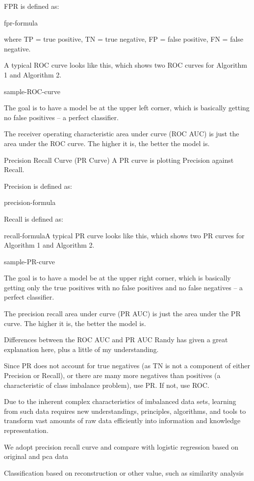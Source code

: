 FPR is defined as:

fpr-formula

where TP = true positive, TN = true negative, FP = false positive, FN = false negative.

A typical ROC curve looks like this, which shows two ROC curves for Algorithm 1 and Algorithm 2.

sample-ROC-curve

The goal is to have a model be at the upper left corner, which is basically getting no false positives – a perfect classifier.

The receiver operating characteristic area under curve (ROC AUC) is just the area under the ROC curve. The higher it is, the better the model is.

Precision Recall Curve (PR Curve)
A PR curve is plotting Precision against Recall.

Precision is defined as:

precision-formula

Recall is defined as:

recall-formulaA typical PR curve looks like this, which shows two PR curves for Algorithm 1 and Algorithm 2.

sample-PR-curve

The goal is to have a model be at the upper right corner, which is basically getting only the true positives with no false positives and no false negatives – a perfect classifier.

The precision recall area under curve (PR AUC) is just the area under the PR curve. The higher it is, the better the model is.

Differences between the ROC AUC and PR AUC
Randy has given a great explanation here, plus a little of my understanding.

Since PR does not account for true negatives (as TN is not a component of either Precision or Recall), or there are many more negatives than positives (a characteristic of class imbalance problem), use PR. If not, use ROC.

Due to the inherent complex characteristics of imbalanced data sets, learning from such data requires new understandings, principles, algorithms, and tools to transform vast amounts of raw data efficiently into information and knowledge representation.

We adopt precision recall curve and compare with logistic regression based on original and pca data

Classification based on reconstruction or other value, such as similarity analysis

